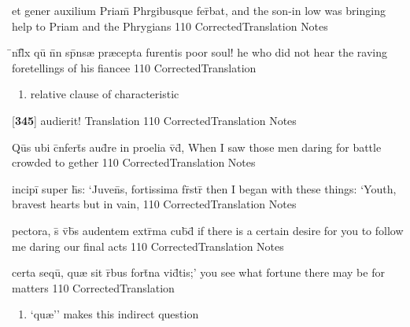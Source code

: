 \latline
  {et gener auxilium Priam\={} Phrgibusque fer\={}bat,}
  { and the son-in low was bringing help to Priam and the Phrygians }
  {110}
  { CorrectedTranslation }
  { Notes }


\latline
  {\={\macron {\i}}nf\={}l\={\macron {\i}}x qu\={\macron {\i}} n\={}n sp\={}ns{\ae} pr{\ae}cepta furentis}
  { poor soul! he who did not hear the raving foretellings of his fiancee}
  {110}
  { CorrectedTranslation }
  { \begin{enumerate}
  	\item relative clause of characteristic
  \end{enumerate} }


\latline
  {[\textbf{345}] audierit!}
  { Translation }
  {110}
  { CorrectedTranslation }
  { Notes }


\latline
  {Qu\={}s ubi c\={}nfert\={}s aud\={}re in proelia v\={\macron {\i}}d\={\macron {\i}},}
  { When I saw those men daring for battle crowded to gether }
  {110}
  { CorrectedTranslation }
  { Notes }


\latline
  {incipi\={} super h\={\macron {\i}}s: `Juven\={}s, fortissima fr\={}str\={}}
  { then I began with these things:  `Youth, bravest hearts but in vain, }
  {110}
  { CorrectedTranslation }
  { Notes }


\latline
  {pectora, s\={\macron {\i}} v\={}b\={\macron {\i}}s audentem extr\={}ma cub\={\macron {\i}}d\={}}
  { if there is a certain desire for you to follow me daring our final acts  }
  {110}
  { CorrectedTranslation }
  { Notes }


\latline
  {certa sequ\={\macron {\i}}, qu{\ae} sit r\={}bus fort\={}na vid\={}tis;'}
  { you see what fortune there may be for matters }
  {110}
  { CorrectedTranslation }
  { \begin{enumerate}
      	\item `qu{\ae}'' makes this indirect question
        \end{enumerate} 
  }


